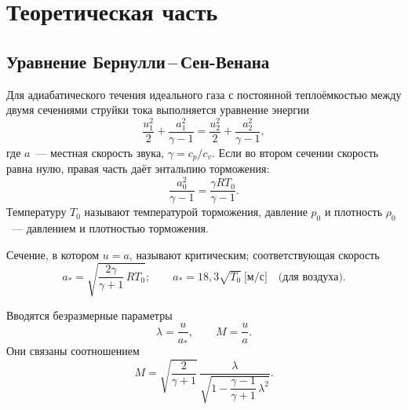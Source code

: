 \documentclass[12pt,a4paper]{article}
\begin{document}
\section{Теоретическая часть}

\subsection{Уравнение Бернулли\,--\,Сен-Венана}

Для адиабатического течения идеального газа с постоянной теплоёмкостью
между двумя сечениями струйки тока выполняется уравнение энергии
\begin{equation}
    \frac{u_1^2}{2} + \frac{a_1^2}{\gamma-1}
    =
    \frac{u_2^2}{2} + \frac{a_2^2}{\gamma-1},
    \label{eq:bern}
\end{equation}
где $a$~--- местная скорость звука, $\gamma = c_p/c_v$.
Если во втором сечении скорость равна нулю, правая часть даёт энтальпию
торможения:
\begin{equation}
    \frac{a_0^2}{\gamma-1} = \frac{\gamma R T_0}{\gamma-1}.
\end{equation}
Температуру $T_0$ называют температурой торможения, давление $p_0$ и
плотность $\rho_0$~--- давлением и плотностью торможения.

Сечение, в котором $u = a$, называют критическим; соответствующая
скорость
\begin{equation}
    a_* = \sqrt{\frac{2\gamma}{\gamma+1}\, R T_0};
    \qquad
    a_* = 18{,}3\sqrt{T_0}\ \text{[м/с]}
    \quad\text{(для воздуха)}.
\end{equation}

Вводятся безразмерные параметры
\[
    \lambda = \frac{u}{a_*},
    \qquad
    M = \frac{u}{a}.
\]
Они связаны соотношением
\begin{equation}
    M =
    \sqrt{\frac{2}{\gamma+1}}\,
    \frac{\lambda}{\sqrt{1 - \dfrac{\gamma-1}{\gamma+1}\,\lambda^2}}.
    \label{eq:Mlam}
\end{equation}
\end{document}
